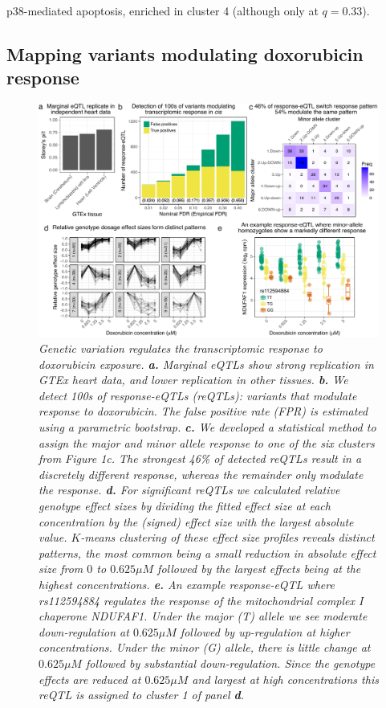\documentclass{article}
\begin{document}
p38-mediated apoptosis\cite{Zarubin2005}, enriched in cluster 4 (although only at $q=0.33$).

\subsection*{Mapping variants modulating doxorubicin response}

\begin{figure}
\begin{center}
    \includegraphics[width=1\textwidth]{../figures/fig2.pdf}     \caption{\it{Genetic variation regulates the transcriptomic response to doxorubicin exposure. \textbf{a.} Marginal eQTLs show strong replication in GTEx heart data, and lower replication in other tissues. \textbf{b.} We detect 100s of response-eQTLs (reQTLs): variants that modulate response to doxorubicin. The false positive rate (FPR) is estimated using a parametric bootstrap. \textbf{c.} We developed a statistical method to assign the major and minor allele response to one of the six clusters from Figure 1c. The strongest 46\% of detected reQTLs result in a discretely different response, whereas the remainder only modulate the response. \textbf{d.} For significant reQTLs we calculated relative genotype effect sizes by dividing the fitted effect size at each concentration by the (signed) effect size with the largest absolute value. $K$-means clustering of these effect size profiles reveals distinct patterns, the most common being a small reduction in absolute effect size from $0$ to $0.625\mu M$ followed by the largest effects being at the highest concentrations. \textbf{e.} An example response-eQTL where rs112594884 regulates the response of the mitochondrial complex I chaperone NDUFAF1. Under the major (T) allele we see moderate down-regulation at $0.625\mu M$ followed by up-regulation at higher concentrations. Under the minor (G) allele, there is little change at $0.625\mu M$ followed by substantial down-regulation. Since the genotype effects are reduced at $0.625\mu M$ and largest at high concentrations this reQTL is assigned to cluster 1 of panel \textbf{d}.}}
    \label{fig2}
    \end{center}
\end{figure}
\end{document}
